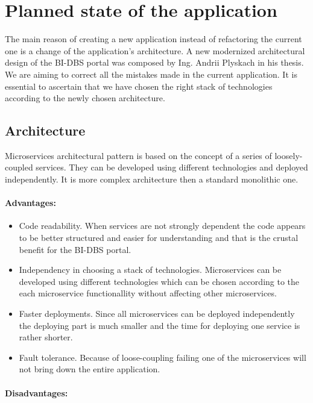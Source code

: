 \section{Planned state of the application} The main reason of creating a new application instead of refactoring the current one is a change of the application's architecture. A new modernized architectural design of the BI-DBS portal was composed by Ing. Andrii Plyskach in his thesis. We are aiming to correct all the mistakes made in the current application. It is essential to ascertain that we have chosen the right stack of technologies according to the newly chosen architecture.


\subsection{Architecture}
Microservices architectural pattern is based on the concept of a series of loosely-coupled services. They can be developed using different technologies and deployed independently. It is more complex architecture then a standard monolithic one. 

\paragraph*{Advantages:}
\begin{itemize}
  \item Code readability. When services are not strongly dependent the code appears to be better structured and easier for understanding and that is the crustal benefit for the BI-DBS portal.
  
  \item Independency in choosing a stack of technologies. Microservices can be developed using different technologies which can be chosen according to the each microservice functionallity without affecting other microservices.
  
  \item Faster deployments. Since all microservices can be deployed independently the deploying part is much smaller and the time for deploying one service is rather shorter.

  \item Fault tolerance. Because of loose-coupling failing one of the microservices will not bring down the entire application.
\end{itemize}

\paragraph*{Disadvantages:}

